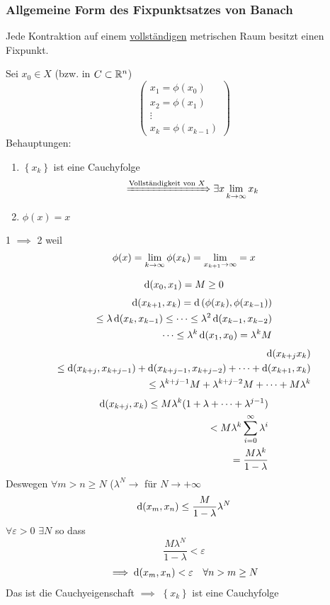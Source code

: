 \subsubsection{Allgemeine Form des Fixpunktsatzes von Banach}
\begin{Sat}
  Jede Kontraktion auf einem \ul{vollständigen} metrischen Raum besitzt einen Fixpunkt.
\end{Sat}
\begin{Bew}
  Sei $x_0\in X$ (bzw. in $C\subset\mathbb{R}^n$)
  \[ \begin{pmatrix}
    x_1=\phi(x_0)\\
    x_2=\phi(x_1)\\
    \vdots \\
    x_k=\phi(x_{k-1})
  \end{pmatrix}\]
  Behauptungen:
  \begin{enumerate}
    \item $\left\{ x_k \right\}$ ist eine Cauchyfolge 
      \[\xRightarrow{\text{Vollständigkeit von $X$}}\exists x\displaystyle\lim_{k\rightarrow\infty}x_k\]
    \item $\phi(x)=x$
  \end{enumerate}
  1 $\implies$ 2 weil
  \[\phi(x)=\displaystyle\lim_{k\rightarrow\infty}\phi(x_k)=\displaystyle\lim_{x_{k+1}\rightarrow\infty}=x\]
\end{Bew}
\begin{Bew}
    \[\operatorname{d}(x_0,x_1)=M\geq 0\]
  \begin{eqnarray*}
    \operatorname{d}(x_{k+1},x_k)=\operatorname{d}\left( \phi(x_k),\phi(x_{k-1}) \right)\\
    \leq \lambda\operatorname{d}(x_k,x_{k-1})\leq \cdots \leq\lambda^2\operatorname{d}(x_{k-1},x_{k-2})\\
    \cdots\leq \lambda^k\operatorname{d}(x_1,x_0)=\lambda^kM
  \end{eqnarray*}
  \begin{eqnarray*}
    \operatorname{d}(x_{k+j}x_k)\\
    \leq\operatorname{d}(x_{k+j},x_{k+j-1})+\operatorname{d}(x_{k+j-1},x_{k+j-2})+\cdots+\operatorname{d}(x_{k+1},x_{k})\\
    \leq\lambda^{k+j-1}M+\lambda^{k+j-2}M+\cdots+M\lambda^k
  \end{eqnarray*}
  \begin{eqnarray*}
    \operatorname{d}(x_{k+j},x_k)\leq M\lambda^k(1+\lambda+\cdots+\lambda^{j-1})\\
    <M\lambda^k\sum^\infty_{i=0}\lambda^i\\
    =\frac{M\lambda^k}{1-\lambda}
  \end{eqnarray*}
  Deswegen $\forall m>n\geq N$ ($\lambda^N\to$ für $N\to+\infty$
  \[\operatorname{d}(x_m,x_n)\leq\frac{M}{1-\lambda}\lambda^N\]
  $\forall \varepsilon>0$ $\exists N$ so dass
  \[\frac{M\lambda^N}{1-\lambda}<\varepsilon\]
  \begin{align*}
    \implies\operatorname{d}(x_m,x_n)<\varepsilon& & \forall n>m\geq N
  \end{align*}
  Das ist die Cauchyeigenschaft $\implies$ $\left\{ x_k \right\}$ ist eine Cauchyfolge
\end{Bew}

